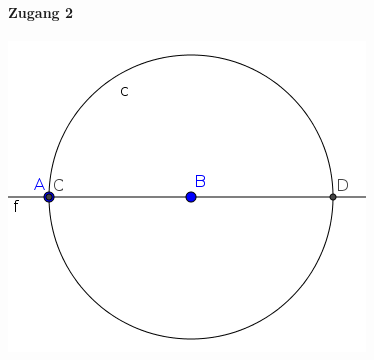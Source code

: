\documentclass{article}
\begin{document}
\paragraph{Zugang 2}
\begin{center}
\includegraphics[scale=0.5]{limitations-Thales2-1}
\end{center}
\end{document}
